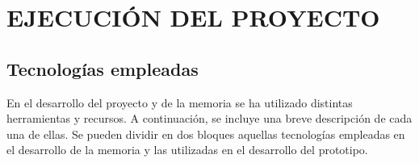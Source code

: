 \chapter{EJECUCIÓN DEL PROYECTO}\label{ejecucion}
    

    \section{Tecnologías empleadas}\label{tec}
        
    En el desarrollo del proyecto y de la memoria se ha utilizado distintas herramientas y recursos. A continuación, se incluye una breve descripción de cada una de ellas. Se pueden dividir en dos bloques aquellas tecnologías empleadas en el desarrollo de la memoria y las utilizadas en el desarrollo del prototipo.

